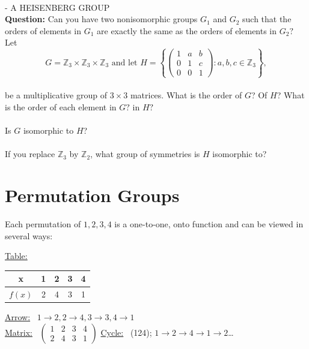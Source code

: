 \documentclass[12pt]{book}
\theoremstyle{definition}
\begin{document}
~\\[.2in]
 - A HEISENBERG GROUP \\[.2in]
\textbf{Question:} Can you have two nonisomorphic groups $ G_1 $ and $ G_2 $ such that the orders of elements in $ G_1 $ are exactly the same as the orders of elements in $ G_2? $\\

Let $$ G=\mathbb{Z}_3 \times \mathbb{Z}_3 \times \mathbb{Z}_3  \text{ and let } H=\left\{
\begin{pmatrix}
1 & a & b \\
0 & 1 & c \\
0 & 0 & 1
\end{pmatrix} : a,b,c\in \mathbb{Z}_3 \right\}, 
$$
~\\
be a multiplicative group of $ 3\times 3 $ matrices. What is the order of $ G $? Of $ H $? What is the order of each element in $ G? $ in $ H? $
~\\
~\\
Is $ G $ isomorphic to $ H $?
~\\
~\\
If you replace $ \mathbb{Z}_3$ by $\mathbb{Z}_2 $, what group of symmetries is $ H $ isomorphic to?

\clearpage

\section{Permutation Groups}
 Each permutation of $ 1,2,3,4 $ is a one-to-one, onto function and can be viewed in several ways:

\underline{Table:}~ \begin{tabular}{c|cccc}
	
	x & 1 & 2 & 3 & 4 \\
	\hline
	$ f(x) $ & 2 & 4 & 3 & 1 \\
\end{tabular}
\quad\quad \underline{Arrow:}~ $ 1\rightarrow2,2\rightarrow4,3\rightarrow3,4\rightarrow1 $\\

\underline{Matrix:}~ $\begin{pmatrix} 
	1 & 2 & 3 & 4 \\
	2 & 4 & 3 & 1 
\end{pmatrix}$ \hspace{2cm} \underline{Cycle:}~ (124); $ 1\rightarrow2\rightarrow4\rightarrow1\rightarrow 2 $\dots\\
\end{document}
